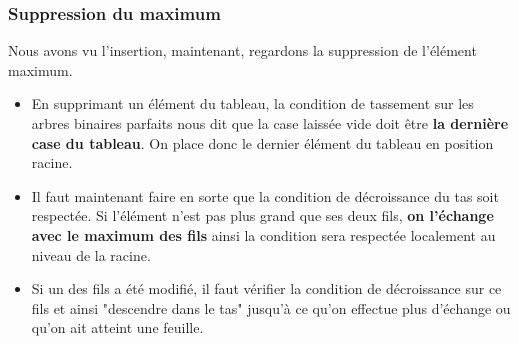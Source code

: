 \documentclass{../cours}
\begin{document}
\subsubsection{Suppression du maximum} 

Nous avons vu l'insertion, maintenant, regardons la suppression de l'élément maximum.

\begin{itemize}
\item En supprimant un élément du tableau, la condition de tassement sur les arbres binaires parfaits nous dit que la case
laissée vide doit être \textbf{la dernière case du tableau}. On place donc le dernier élément du tableau en position racine.
\item Il faut maintenant faire en sorte que la condition de décroissance du tas soit respectée. Si l'élément n'est pas plus grand que
ses deux fils, \textbf{on l'échange avec le maximum des fils} ainsi la condition sera respectée localement au niveau de la racine. 
\item Si un des fils a été modifié, il faut vérifier la condition de décroissance sur ce fils et ainsi "descendre dans le tas" jusqu'à ce
qu'on effectue plus d'échange ou qu'on ait atteint une feuille.
\end{itemize}
\end{document}
